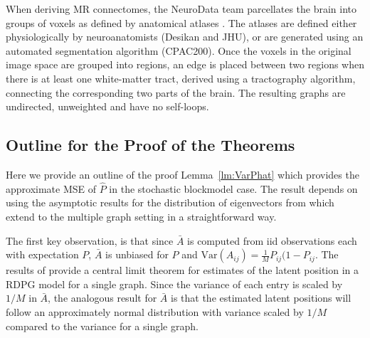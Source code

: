 \documentclass[10pt,letterpaper]{article}
\begin{document}
When deriving MR connectomes, the NeuroData team parcellates the brain into groups of voxels as defined by anatomical atlases \cite{neurodata, kiar2016graph}. The atlases are defined either physiologically by neuroanatomists (Desikan and JHU), or are generated using an automated segmentation algorithm (CPAC200).
Once the voxels in the original image space are grouped into regions, an edge is placed between two regions when there is at least one white-matter tract, derived using a tractography algorithm, connecting the corresponding two parts of the brain.
The resulting graphs are undirected, unweighted and have no self-loops.


\subsection{Outline for the Proof of the Theorems}
\label{section:outline_proof}
Here we provide an outline of the proof Lemma~\ref{lm:VarPhat} which provides the approximate MSE of $\hat{P}$ in the stochastic blockmodel case.
The result depends on using the asymptotic results for the distribution of eigenvectors from \citet{athreya2013limit} which extend to the multiple graph setting in a straightforward way.

The first key observation, is that since $\bar{A}$ is computed from iid observations each with expectation $P$, $\bar{A}$ is unbiased for $P$ and $\mathrm{Var}(A_{ij}) = \frac{1}{M}P_{ij}(1-P_{ij}$.
The results of \citet{athreya2013limit} provide a central limit theorem for estimates of the latent position in a RDPG model for a single graph.
Since the variance of each entry is scaled by $1/M$ in $\bar{A}$, the analogous result for $\bar{A}$ is that the estimated latent positions will follow an approximately normal distribution with variance scaled by $1/M$ compared to the variance for a single graph. 
    

\end{document}
